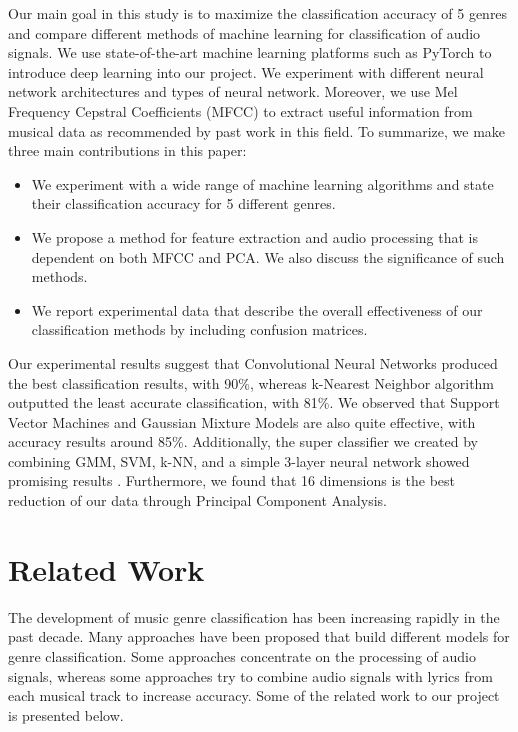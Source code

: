Our main goal in this study is to maximize the classification accuracy of 5 genres and compare different methods of machine learning for classification of audio signals. We use state-of-the-art machine learning platforms such as PyTorch \cite{PyTorch:2017} to introduce deep learning into our project. We experiment with different neural network architectures and types of neural network. Moreover, we use Mel Frequency Cepstral Coefficients (MFCC) \cite{MFCC:2011} to extract useful information from musical data as recommended by past work in this field.
To summarize, we make three main contributions in this paper:
\begin{itemize}
  \item We experiment with a wide range of machine learning algorithms and state their classification accuracy for 5 different genres. 
  \item We propose a method for feature extraction and audio processing that is dependent on both MFCC and PCA. We also discuss the significance of such methods. 
  \item We report experimental data that describe the overall effectiveness of our classification methods by including confusion matrices. 
\end{itemize}

Our experimental results suggest that Convolutional Neural Networks produced the best classification results, with 90\%, whereas k-Nearest Neighbor algorithm outputted the least accurate classification, with 81\%. We observed that Support Vector Machines and Gaussian Mixture Models are also quite effective, with accuracy results around 85\%. Additionally, the super classifier we created by combining GMM, SVM, k-NN, and a simple 3-layer neural network showed promising results . Furthermore, we found that 16 dimensions is the best reduction of our data through Principal Component Analysis. 

\section{Related Work}\label{sec:related}

The development of music genre classification has been increasing rapidly in the past decade. Many approaches have been proposed that build different models for genre classification. Some approaches concentrate on the processing of audio signals, whereas some approaches try to combine audio signals with lyrics from each musical track to increase accuracy. Some of the related work to our project is presented below. 

